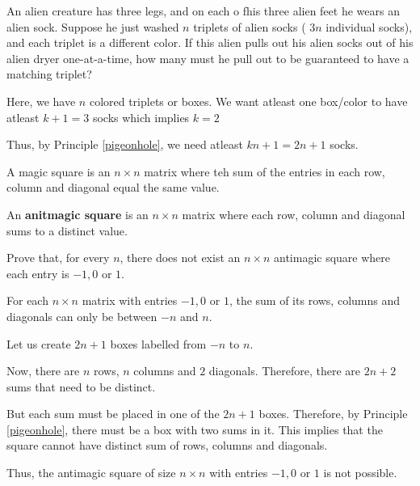 \begin{problem}
	An alien creature has three legs, and on each o fhis three alien feet he wears an alien sock. Suppose he just washed $n$ triplets of alien socks ( $3n$ individual socks), and each triplet is a different color. If this alien pulls out his alien socks out of his alien dryer one-at-a-time, how many must he pull out to be guaranteed to have a matching triplet?
\end{problem}

\begin{solution}
	Here, we have $n$ colored triplets or boxes. We want atleast one box/color to have atleast $k+1 = 3$ socks which implies $k = 2$

	Thus, by Principle \ref{pigeonhole}, we need atleast $kn+1 = 2n+1$ socks.
\end{solution}

\begin{problem}
	A magic square is an $n \times n$ matrix where teh sum of the entries in each row, column and diagonal equal the same value.

	An \textbf{anitmagic square} is an $n \times n$ matrix where each row, column and diagonal sums to a distinct value.

	Prove that, for every $n$, there does not exist an $n \times n$ antimagic square where each entry is $-1,0$ or $1$.
\end{problem}

\begin{solution}
	For each $n \times n$ matrix with entries $-1, 0$ or $1$, the sum of its rows, columns and diagonals can only be between $-n$ and $n$.

	Let us create $2n+1$ boxes labelled from $-n$ to $n$.

	Now, there are $n$ rows, $n$ columns and $2$ diagonals. Therefore, there are $2n+2$ sums that need to be distinct.

	But each sum must be placed in one of the $2n+1$ boxes. Therefore, by Principle \ref{pigeonhole}, there must be a box with two sums in it. This implies that the square cannot have distinct sum of rows, columns and diagonals.

	Thus, the antimagic square of size $n \times n$ with entries $-1,0$ or $1$ is not possible.
\end{solution}

